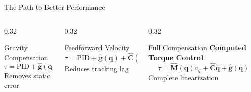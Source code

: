 \documentclass[10pt]{beamer}
\newcommand{\vect}[1]{\boldsymbol{#1}}
\newcommand{\M}{\vect{M}}
\newcommand{\C}{\vect{C}}
\newcommand{\g}{\vect{g}}
\newcommand{\q}{\vect{q}}
\newcommand{\qd}{\vect{q}_d}
\newcommand{\qdot}{\dot{\vect{q}}}
\begin{document}
\begin{frame}{The Path to Better Performance}
    \begin{columns}
        \begin{column}{0.32\textwidth}
            \begin{block}{Gravity Compensation}
                \[
                \tau = \text{PID} + \hat{\g}(\q)
                \]
                \footnotesize Removes static error
            \end{block}
        \end{column}
        
        \begin{column}{0.32\textwidth}
            \begin{block}{Feedforward Velocity}
                \[
                \tau = \text{PID} + \hat{\g}(\q) + \hat{\C}(\q, \qd)\qd
                \]
                \footnotesize Reduces tracking lag
            \end{block}
        \end{column}
        
        \begin{column}{0.32\textwidth}
            \begin{alertblock}{Full Compensation}
                \textbf{Computed Torque Control}
                \[
                \tau = \hat{\M}(\q)a_q + \hat{\C}\qdot + \hat{\g}(\q)
                \]
                \footnotesize Complete linearization
            \end{alertblock}
        \end{column}
    \end{columns}
\end{frame}
\end{document}
